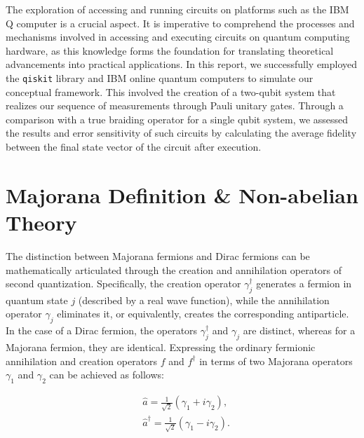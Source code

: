 \documentclass{article}
\def\c#1{\texttt{#1}}
\begin{document}
The exploration of accessing and running circuits on platforms such as the IBM Q computer is a crucial aspect. It is imperative to comprehend the processes and mechanisms involved in accessing and executing circuits on quantum computing hardware, as this knowledge forms the foundation for translating theoretical advancements into practical applications. In this report, we successfully employed the \c{qiskit} library and IBM online quantum computers to simulate our conceptual framework. This involved the creation of a two-qubit system that realizes our sequence of measurements through Pauli unitary gates. Through a comparison with a true braiding operator for a single qubit system, we assessed the results and error sensitivity of such circuits by calculating the average fidelity between the final state vector of the circuit after execution.

\section{Majorana Definition \& Non-abelian Theory} %
\label{sec:Majorana Definition}
The distinction between Majorana fermions and Dirac fermions can be mathematically articulated through the creation and annihilation operators of second quantization. Specifically, the creation operator $\gamma_j^{\dagger}$ generates a fermion in quantum state $j$ (described by a real wave function), while the annihilation operator $\gamma_j$ eliminates it, or equivalently, creates the corresponding antiparticle. In the case of a Dirac fermion, the operators $\gamma_j^{\dagger}$ and $\gamma_j$ are distinct, whereas for a Majorana fermion, they are identical. Expressing the ordinary fermionic annihilation and creation operators $f$ and $f^{\dagger}$ in terms of two Majorana operators $\gamma_1$ and $\gamma_2$ can be achieved as follows:

$$
	\begin{aligned}
		 & \hat{a}=\frac{1}{\sqrt{2}}\left(\gamma_1+i \gamma_2\right),            \\
		 & \hat{a}^{\dagger}=\frac{1}{\sqrt{2}}\left(\gamma_1-i \gamma_2\right) .
		\label{eq:ferm as mf}
	\end{aligned}
$$
\end{document}
